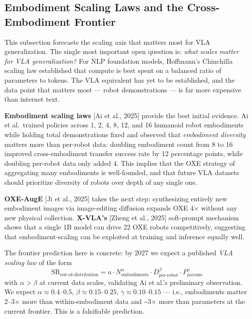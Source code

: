 \subsection{Embodiment Scaling Laws and the Cross-Embodiment Frontier}\label{embodiment-scaling-laws-and-the-cross-embodiment-frontier}

This subsection forecasts the scaling axis that matters most for VLA generalization. The single most important open question is: \emph{what scales matter for VLA generalization?} For NLP foundation models, Hoffmann's Chinchilla scaling law established that compute is best spent on a balanced ratio of parameters to tokens. The VLA equivalent has yet to be established, and the data point that matters most --- robot demonstrations --- is far more expensive than internet text.

\textbf{Embodiment scaling laws} {[}Ai et al., 2025{]} provide the best initial evidence. Ai et al.~trained policies across 1, 2, 4, 8, 12, and 16 humanoid robot embodiments while holding total demonstrations fixed and observed that \emph{embodiment diversity} matters more than per-robot data: doubling embodiment count from 8 to 16 improved cross-embodiment transfer success rate by 12 percentage points, while doubling per-robot data only added 4. This implies that the OXE strategy of aggregating many embodiments is well-founded, and that future VLA datasets should prioritize diversity of robots over depth of any single one.

\textbf{OXE-AugE} {[}Ji et al., 2025{]} takes the next step: synthesizing entirely new embodiment images via image-editing diffusion expands OXE 4× without any new physical collection. \textbf{X-VLA's} {[}Zheng et al., 2025{]} soft-prompt mechanism shows that a single 1B model can drive 22 OXE robots competitively, suggesting that embodiment-scaling can be exploited at training and inference equally well.

The frontier prediction here is concrete: by 2027 we expect a published \emph{VLA scaling law} of the form
\[\text{SR}_{\text{out-of-distribution}} = a \cdot N_{\text{embodiments}}^{\alpha} \cdot D_{\text{per-robot}}^{\beta} \cdot P_{\text{params}}^{\gamma}\]
with \(\alpha > \beta\) at current data scales, validating Ai et al.'s preliminary observation. We expect \(\alpha \approx 0.4–0.5\), \(\beta \approx 0.15–0.25\), \(\gamma \approx 0.10–0.15\) --- i.e., embodiments matter 2--3× more than within-embodiment data and \textasciitilde3× more than parameters at the current frontier. This is a falsifiable prediction.

